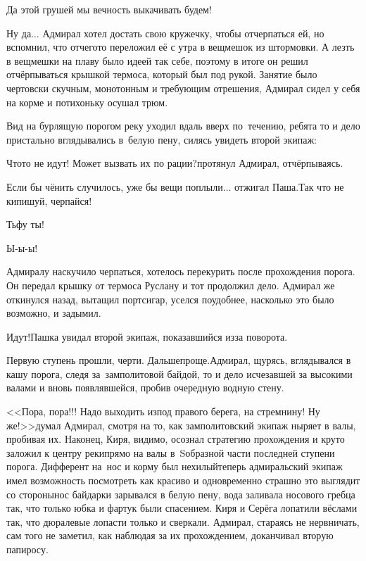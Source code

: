 \diagdash Да этой грушей мы вечность выкачивать будем!

\diagdash Ну да$\ldots$ \mdash Адмирал хотел достать свою кружечку, чтобы отчерпаться ей, но вспомнил, что отчего\sdash то переложил её с утра в вещмешок из штормовки. А лезть в вещмешки на плаву было идеей так себе, поэтому в итоге он решил отчёрпываться крышкой термоса, который был под рукой. Занятие было чертовски скучным, монотонным и требующим отрешения, Адмирал сидел у себя на корме и потихоньку осушал трюм.

Вид на бурлящую порогом реку уходил вдаль вверх по~течению, ребята то и дело пристально вглядывались в~белую пену, силясь увидеть второй экипаж:

\diagdash Что\sdash то не идут! Может вызвать их по рации?\mdash протянул Адмирал, отчёрпываясь.

\diagdash Если бы чё\sdash нить случилось, уже бы вещи поплыли$\ldots$ \mdash отжигал Паша.\mdash Так что не кипишуй, черпайся!

\diagdash Тьфу ты!

\diagdash Ы-ы-ы!

Адмиралу наскучило черпаться, хотелось перекурить после прохождения порога. Он передал крышку от термоса Руслану и тот продолжил дело. Адмирал же откинулся назад, вытащил портсигар, уселся поудобнее, насколько это было возможно, и задымил.

\diagdash Идут!\mdash Пашка увидал второй экипаж, показавшийся из\sdash за поворота. 

\diagdash Первую ступень прошли, черти. Дальше\mdash проще.\mdash Адмирал, щурясь, вглядывался в кашу порога, следя за~замполитовой байдой, то и дело исчезавшей за высокими валами и вновь появлявшейся, пробив очередную водную стену.

<<Пора, пора!!! Надо выходить из\sdash под правого берега, на стремнину! Ну же!>>\mdash думал Адмирал, смотря на то, как замполитовский экипаж ныряет в валы, пробивая их. Наконец, Киря, видимо, осознал стратегию прохождения и круто заложил к центру реки\mdash прямо на валы в~S\sdash образной части последней ступени порога. Дифферент на~нос и корму был нехилый\mdash теперь адмиральский экипаж имел возможность посмотреть как красиво и одновременно страшно это выглядит со стороны\mdash нос байдарки зарывался в белую пену, вода заливала носового гребца так, что только юбка и фартук были спасением. Киря и Серёга лопатили вёслами так, что дюралевые лопасти только и сверкали. Адмирал, стараясь не нервничать, сам того не заметил, как наблюдая за их прохождением, доканчивал вторую папиросу.

